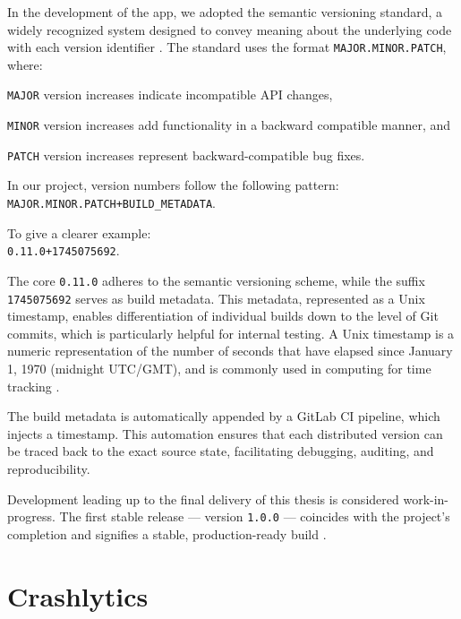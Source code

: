 \documentclass[
  digital,     %
  oneside,     %
  nosansbold,  %
  nocolorbold, %
  lof,         %
  lot,         %
]{fithesis4}
\begin{document}
In the development of the app, we adopted the semantic versioning standard, a widely recognized system designed to convey meaning about the underlying code with each version identifier \cite{semver}. The standard uses the format \texttt{MAJOR.MINOR.PATCH}, where:

\begin{compactitem}
  \item \texttt{MAJOR} version increases indicate incompatible \gls{API} changes,
  \item \texttt{MINOR} version increases add functionality in a backward compatible manner, and
  \item \texttt{PATCH} version increases represent backward-compatible bug fixes.
\end{compactitem}

\vspace{\baselineskip}

In our project, version numbers follow the following pattern:\\\texttt{MAJOR.MINOR.PATCH+BUILD\_METADATA}. 

To give a clearer example:\\\texttt{0.11.0+1745075692}.

The core \texttt{0.11.0} adheres to the semantic versioning scheme, while the suffix \texttt{1745075692} serves as build metadata. This metadata, represented as a Unix timestamp, enables differentiation of individual builds down to the level of Git commits, which is particularly helpful for internal testing. A Unix timestamp is a numeric representation of the number of seconds that have elapsed since January 1, 1970 (midnight \gls{UTC}/\gls{GMT}), and is commonly used in computing for time tracking \cite{mdnUnixTime}.

The build metadata is automatically appended by a GitLab \gls{CI} pipeline, which injects a timestamp. This automation ensures that each distributed version can be traced back to the exact source state, facilitating debugging, auditing, and reproducibility.

Development leading up to the final delivery of this thesis is considered work-in-progress. The first stable release --- version \texttt{1.0.0} --- coincides with the project's completion and signifies a stable, production-ready build \cite{semver}.

\section{Crashlytics}
\end{document}
